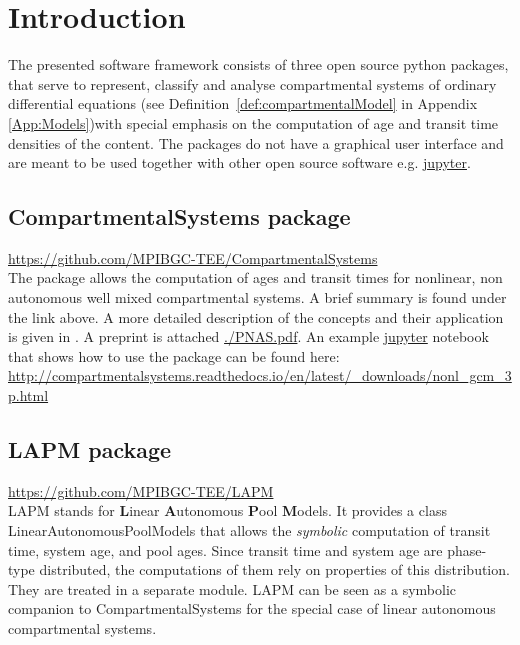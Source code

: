 \documentclass[a4paper]{article}
\DeclareRobustCommand{\Defref}[1]{\mbox{Definition \ref{#1}}}
\DeclareRobustCommand{\Appendixref}[1]{Appendix \ref{#1}}
\begin{document}
\section{Introduction}
The presented software framework consists of three open source python packages, 
that serve to represent, classify and analyse compartmental systems of ordinary differential equations (see \Defref{def:compartmentalModel} in \Appendixref{App:Models})with special emphasis on the computation of age and transit time densities of the content.  
The packages do not have a graphical user interface and are meant to be used together with other open source software e.g. \href{jupyter.org}{jupyter}. 

\subsection{CompartmentalSystems package}
\url{https://github.com/MPIBGC-TEE/CompartmentalSystems}\\
The package allows the computation of ages and transit times for nonlinear, non autonomous well mixed compartmental systems.
A brief summary is found under the link above. A more detailed description of the concepts and their application is given in \citet[]{MetzlerMuellerSierra2018PNAS}. A preprint is attached \url{./PNAS.pdf}.
An example \href{jupyter.org}{jupyter} notebook that shows how to use the package can be found here:
\url{http://compartmentalsystems.readthedocs.io/en/latest/_downloads/nonl_gcm_3p.html}

\subsection{LAPM package}
\url{https://github.com/MPIBGC-TEE/LAPM}\\
LAPM stands for {\bf L}inear {\bf A}utonomous {\bf P}ool {\bf M}odels. It provides a class LinearAutonomousPoolModels that allows the \emph{symbolic} computation of transit time, system age, and pool ages.
Since transit time and system age are phase-type distributed, the computations of them rely on properties of this distribution. They are treated in a separate module.
LAPM can be seen as a symbolic companion to CompartmentalSystems for the special case of linear autonomous compartmental systems.
\end{document}
